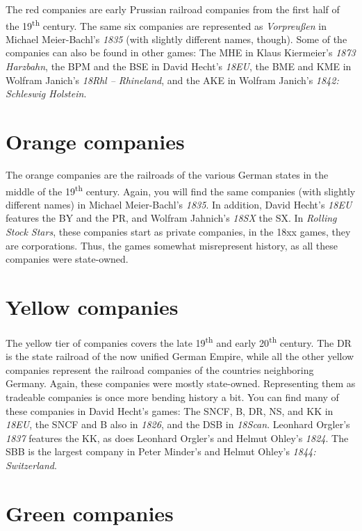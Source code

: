 \documentclass[10pt,final]{report}
\begin{document}
The red companies are early Prussian railroad companies from the first
half of the 19\textsuperscript{th} century.  The same six companies
are represented as \emph{Vorpreußen} in Michael Meier-Bachl's
\emph{1835} (with slightly different names, though). Some of the
companies can also be found in other games: The MHE in Klaus
Kiermeier's \emph{1873 Harzbahn}, the BPM and the BSE in David Hecht's
\emph{18EU}, the BME and KME in Wolfram Janich's \emph{18Rhl --
  Rhineland}, and the AKE in Wolfram Janich's \emph{1842: Schleswig
  Holstein}.

\section{Orange companies}

The orange companies are the railroads of the various German states in
the middle of the 19\textsuperscript{th} century.  Again, you will
find the same companies (with slightly different names) in Michael
Meier-Bachl's \emph{1835}. In addition, David Hecht's \emph{18EU}
features the BY and the PR, and Wolfram Jahnich's \emph{18SX} the SX.
In \emph{Rolling Stock Stars}, these companies start as private companies,
in the 18xx games, they are corporations.  Thus, the games 
somewhat misrepresent history, as all these companies were
state-owned.

\section{Yellow companies}

The yellow tier of companies covers the late 19\textsuperscript{th}
and early 20\textsuperscript{th} century. The DR is the state railroad
of the now unified German Empire, while all the other yellow companies
represent the railroad companies of the countries neighboring
Germany. Again, these companies were mostly state-owned. Representing
them as tradeable companies is once more bending history a bit. You
can find many of these companies in David Hecht's games: The SNCF, B,
DR, NS, and KK in \emph{18EU}, the SNCF and B also in \emph{1826}, and
the DSB in \emph{18Scan}. Leonhard Orgler's \emph{1837} features the
KK, as does Leonhard Orgler's and Helmut Ohley's \emph{1824}. The SBB
is the largest company in Peter Minder's and Helmut Ohley's
\emph{1844: Switzerland}.

\section{Green companies}
\end{document}
